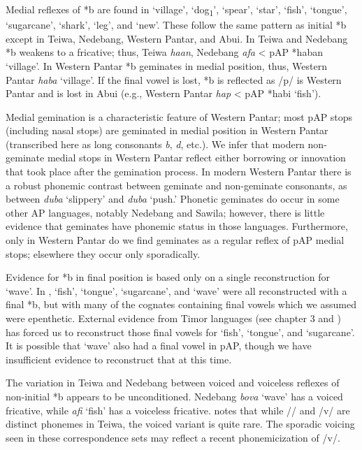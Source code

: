 Medial reflexes of *b are found in `village', `dog\textsubscript{1}', `spear', `star', `fish', `tongue', `sugarcane', `shark', `leg', and `new'. These follow the same pattern as initial *b except in Teiwa, Nedebang, Western Pantar, and Abui. In Teiwa and Nedebang *b weakens to a fricative; thus, Teiwa \textit{ha{\textphi}an}, Nedebang \textit{afa{\ng}} {\textless} pAP *haban `village'. In Western Pantar *b geminates in medial position, thus, Western Pantar \textit{hab{\textlengthmark}a{\ng}} `village'. If the final vowel is lost, *b is reflected as /p/ is Western Pantar and is lost in Abui (e.g., Western Pantar \textit{hap} {\textless} pAP *habi `fish'). 

Medial gemination is a characteristic feature of Western Pantar; most pAP stops (including nasal stops) are geminated in medial position in Western Pantar (transcribed here as long consonants\textit{ b{\textlengthmark}},\textit{ d{\textlengthmark}}, etc.). We infer that modern non-geminate medial stops in Western Pantar reflect either borrowing or innovation that took place after the gemination process. In modern Western Pantar there is a robust phonemic contrast between geminate and non-geminate consonants, as between \textit{duba }`slippery' and \textit{dub{\textlengthmark}a }`push.' Phonetic geminates do occur in some other AP languages, notably Nedebang and Sawila; however, there is little evidence that geminates have phonemic status in those languages. Furthermore, only in Western Pantar do we find geminates as a regular reflex of pAP medial stops; elsewhere they occur only sporadically. 

Evidence for *b in final position is based only on a single reconstruction for `wave'. In \citet{HoltonEtAl2012}, `fish', `tongue', `sugarcane', and `wave' were all reconstructed with a final *b, but with many of the cognates containing final vowels which we assumed were epenthetic. External evidence from Timor languages (see chapter 3 and \citealt{SchapperEtAl2012}) has forced us to reconstruct those final vowels for `fish', `tongue', and `sugarcane'. It is possible that `wave' also had a final vowel in pAP, though we have insufficient evidence to reconstruct that at this time.

The variation in Teiwa and Nedebang between voiced and voiceless reflexes of non-initial *b appears to be unconditioned. Nedebang \textit{bova }`wave' has a voiced fricative, while \textit{a{\textlengthmark}fi} `fish' has a voiceless fricative. \citet[38]{Klamer2010grammar} notes that while /{\textphi}/ and /v/ are distinct phonemes in Teiwa, the voiced variant is quite rare. The sporadic voicing seen in these correspondence sets may reflect a recent phonemicization of /v/. 

